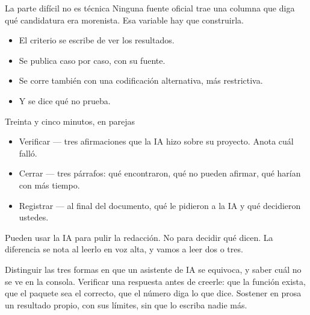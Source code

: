 \begin{frame}{La parte difícil no es técnica}
  \vspace{0.4em}
  Ninguna fuente oficial trae una columna que diga qué candidatura era
  morenista. \ac{Esa variable hay que construirla.}

  \vspace{1.0em}
  \begin{itemize}\setlength{\itemsep}{0.75em}
    \item<2-> El criterio se escribe  de ver los resultados.
    \item<3-> Se publica caso por caso, con su fuente.
    \item<4-> Se corre también con una codificación alternativa, más
          restrictiva.
    \item<5-> Y se dice qué no prueba.
  \end{itemize}

  \vspace{0.9em}
\end{frame}

\begin{frame}{Treinta y cinco minutos, en parejas}
  \vspace{0.4em}
  \begin{itemize}\setlength{\itemsep}{1.0em}
    \item \ac{Verificar} — tres afirmaciones que la IA hizo sobre su
          proyecto. Anota cuál falló.
    \item \ac{Cerrar} — tres párrafos: qué encontraron, qué no pueden
          afirmar, qué harían con más tiempo.
    \item \ac{Registrar} — al final del documento, qué le pidieron a la IA
          y qué decidieron ustedes.
  \end{itemize}

  \vspace{1.1em}
  {\small\color{grisTenue}Pueden usar la IA para pulir la redacción. No para
  decidir qué dicen. La diferencia se nota al leerlo en voz alta, y vamos a
  leer dos o tres.}
\end{frame}

\yasabemos
  {Distinguir las tres formas en que un asistente de IA se equivoca, y saber cuál no se ve en la consola.}
  {Verificar una respuesta antes de creerle: que la función exista, que el paquete sea el correcto, que el número diga lo que dice.}
  {Sostener en prosa un resultado propio, con sus límites, sin que lo escriba nadie más.}

